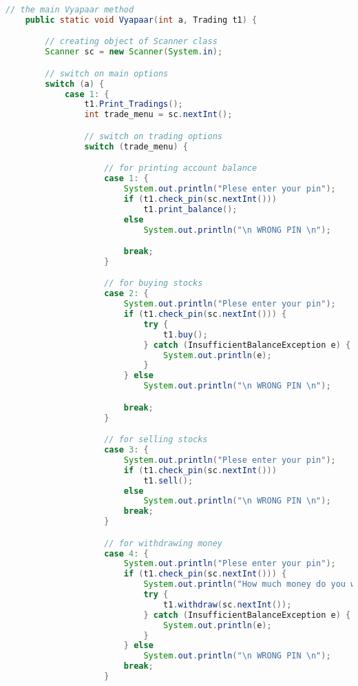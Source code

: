 \documentclass[]{article}
\begin{document}
\begin{lstlisting}[language=java, caption= Java Mini Project ]
    // the main Vyapaar method
    public static void Vyapaar(int a, Trading t1) {

        // creating object of Scanner class
        Scanner sc = new Scanner(System.in);

        // switch on main options
        switch (a) {
            case 1: {
                t1.Print_Tradings();
                int trade_menu = sc.nextInt();

                // switch on trading options
                switch (trade_menu) {

                    // for printing account balance
                    case 1: {
                        System.out.println("Plese enter your pin");
                        if (t1.check_pin(sc.nextInt())) 
                            t1.print_balance();
                        else
                            System.out.println("\n WRONG PIN \n");

                        break;
                    }

                    // for buying stocks 
                    case 2: {
                        System.out.println("Plese enter your pin");
                        if (t1.check_pin(sc.nextInt())) {
                            try {
                                t1.buy();
                            } catch (InsufficientBalanceException e) {
                                System.out.println(e);
                            }
                        } else
                            System.out.println("\n WRONG PIN \n");

                        break;
                    }

                    // for selling stocks
                    case 3: {
                        System.out.println("Plese enter your pin");
                        if (t1.check_pin(sc.nextInt())) 
                            t1.sell();
                        else
                            System.out.println("\n WRONG PIN \n");
                        break;
                    }

                    // for withdrawing money
                    case 4: {
                        System.out.println("Plese enter your pin");
                        if (t1.check_pin(sc.nextInt())) {
                            System.out.println("How much money do you want to withdraw");
                            try {
                                t1.withdraw(sc.nextInt());
                            } catch (InsufficientBalanceException e) {
                                System.out.println(e);
                            }
                        } else
                            System.out.println("\n WRONG PIN \n");
                        break;
                    }


\end{lstlisting}
\end{document}
